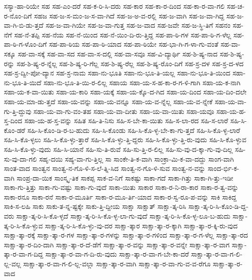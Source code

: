 {ಸಸ್ಯಾ-ಹಾ-ರಿಯೇ
ಸಹ
ಸಹ-ಎಂ-ದರೆ
ಸಹ-ಕ-ರಿ-ಸಿ-ದರು
ಸಹ-ಕಾರ
ಸಹ-ಕಾ-ರ-ದಿಂದ
ಸಹ-ಕಾ-ರ-ವಾ-ಗಲಿ
ಸಹ-ಚ-ರ-ನೊಂ-ದಿಗೆ
ಸಹಜ
ಸಹ-ಜ-ಸ-ಮಂ-ಜ-ಸ-ವಾ-ಗಿದೆ
ಸಹ-ಜ-ಅ-ವ-ರಲ್ಲಿ
ಸಹ-ಜ-ವಾಗಿ
ಸಹ-ಜ-ವಾ-ಗಿದ್ದ
ಸಹ-ಜ-ವಾ-ಗಿ-ಬಿ-ಡು-ತ್ತದೆ
ಸಹ-ಜ-ವಾ-ಗಿಯೇ
ಸಹ-ಜ-ವಾ-ಗುತ್ತ
ಸಹ-ಜ-ವಾದ
ಸಹ-ಜವೇ
ಸಹ-ಜ-ಸ್ಥಿ-ತಿಗೆ
ಸಹನಂ
ಸಹ-ನೆಗೆ
ಸಹ-ನೆ-ತಪ್ಪಿ
ಸಹ-ನೆಯ
ಸಹ-ನೆ-ಯಿಂದ
ಸಹ-ನೆ-ಯಿಂ-ದಿ-ರು-ತ್ತಿದ್ದ
ಸಹ-ಪಾ-ಠಿ-ಗಳ
ಸಹ-ಪಾ-ಠಿ-ಗ-ಳೆಲ್ಲ
ಸಹ-ಪಾ-ಠಿ-ಗ-ಳೊಂ-ದಿಗೆ
ಸಹ-ಪಾ-ಠಿಯ
ಸಹ-ಪಾ-ಠಿ-ಯಾದ
ಸಹ-ಪಾ-ಠಿಯೇ
ಸಹ-ಭಾ-ಗಿ-ಗ-ಳಾ-ಗು-ವಂತೆ
ಸಹ-ವಾ-ಸಕ್ಕೂ
ಸಹ-ವಾ-ಸಕ್ಕೆ
ಸಹ-ವಾ-ಸದ
ಸಹ-ವಾ-ಸ-ದಲ್ಲಿ
ಸಹ-ವಾ-ಸವೂ
ಸಹ-ವಿ-ದ್ಯಾರ್ಥಿ
ಸಹ-ಶಿ-ಷ್ಯ-ನಾದ
ಸಹ-ಶಿ-ಷ್ಯ-ರನ್ನು
ಸಹ-ಶಿ-ಷ್ಯ-ರ-ನ್ನೆಲ್ಲ
ಸಹ-ಶಿ-ಷ್ಯ-ರಿ-ಗೆಲ್ಲ
ಸಹ-ಶಿ-ಷ್ಯ-ರೆಲ್ಲ
ಸಹ-ಶಿ-ಷ್ಯ-ರೊಂ-ದಿಗೆ
ಸಹ-ಸ್ರ-ದಳ
ಸಹ-ಸ್ರ-ದ-ಳದ
ಸಹ-ಸ್ರ-ದ್ವೀ-ಪೋ-ದ್ಯಾನ
ಸಹ-ಸ್ರ-ನಾಮ
ಸಹಾ-ನು-ಭೂತಿ
ಸಹಾ-ನು-ಭೂ-ತಿ-ಯಲ್ಲ
ಸಹಾ-ನು-ಭೂ-ತಿ-ಯಿಂದ
ಸಹಾ-ನು-ಭೂ-ತಿ-ಯಿದೆ
ಸಹಾ-ನು-ಭೂ-ತಿ-ಯಿ-ರ-ಲಿಲ್ಲ
ಸಹಾಯ
ಸಹಾ-ಯ-ಸ-ಹ-ಕಾ-ರ-ಗ-ಳಿ-ಗಾಗಿ
ಸಹಾ-ಯ-ಕ-ನಾಗಿ
ಸಹಾ-ಯ-ಕ-ವಾ-ಯಿತು
ಸಹಾ-ಯ-ಕಾರಿ
ಸಹಾ-ಯಕ್ಕೆ
ಸಹಾ-ಯ-ಕ್ಕೊ-ದ-ಗಿದ
ಸಹಾ-ಯ-ದಿಂದ
ಸಹಾ-ಯ-ದಿಂ-ದಲೇ
ಸಹಾ-ಯ-ಮಾ-ಡು-ತ್ತದೆ
ಸಹಾ-ಯ-ವನ್ನು
ಸಹಾ-ಯ-ವನ್ನೂ
ಸಹಾ-ಯ-ವ-ನ್ನೆಲ್ಲ
ಸಹಾ-ಯ-ವ-ನ್ನೇಕೆ
ಸಹಾ-ಯ-ವಾ-ಗು-ತ್ತಿ-ದ್ದುವು
ಸಹಾ-ಯ-ವಾ-ಗು-ವಂ-ತಹ
ಸಹಾ-ಯ-ವಾ-ದೀತು
ಸಹಾ-ಯ-ವಾ-ಯಿತು
ಸಹಾ-ಯವೂ
ಸಹಾ-ಯ-ಹ-ಸ್ತ-ದಿಂದ
ಸಹಾ-ಯ-ಹ-ಸ್ತ-ವನ್ನು
ಸಹಿತ
ಸಹಿ-ತಿ-ನಿಸು
ಸಹಿ-ಸ-ಬೇ-ಕಾ-ಯಿತು
ಸಹಿ-ಸ-ಲಾ-ರದ
ಸಹಿ-ಸ-ಲಾರೆ
ಸಹಿ-ಸಿ-ಕೊಂ-ಡರೆ
ಸಹಿ-ಸಿ-ಕೊಂ-ಡಿ-ರ-ಬ-ಹುದು
ಸಹಿ-ಸಿ-ಕೊಂಡು
ಸಹಿ-ಸಿ-ಕೊ-ಳ್ಳ-ಬೇ-ಕಾ-ಗು-ತ್ತದೆ
ಸಹಿ-ಸಿ-ಕೊ-ಳ್ಳ-ಲಾರೆ
ಸಹಿ-ಸಿ-ಕೊ-ಳ್ಳಲು
ಸಹಿ-ಸಿ-ಕೊ-ಳ್ಳು-ತ್ತಾರೆ
ಸಹಿ-ಸಿ-ಕೊ-ಳ್ಳು-ತ್ತಿ-ದ್ದರು
ಸಹಿ-ಸಿ-ಕೊ-ಳ್ಳು-ತ್ತಿ-ರು-ವುದು
ಸಹಿ-ಸಿ-ಕೊ-ಳ್ಳುವ
ಸಹಿ-ಸಿ-ಕೊ-ಳ್ಳು-ವುದು
ಸಹಿ-ಸಿ-ಯಾನೆ
ಸಹಿ-ಸು-ತಿ-ರುವೆ
ಸಹಿ-ಸು-ತ್ತಿ-ರ-ಲಿಲ್ಲ
ಸಹಿ-ಸು-ವು-ದ-ಕ್ಕಾ-ಗು-ವು-ದಿಲ್ಲ
ಸಹಿ-ಸು-ವು-ದಾ-ಗಲಿ
ಸಹೃ-ದಯಿ
ಸಹ್ಯ-ವಾ-ಗು-ತ್ತಿಲ್ಲ
ಸಾ
ಸಾಂಕೇ-ತಿ-ಕ-ವಾಗಿ
ಸಾಂಕ್ರಾ-ಮಿ-ಕ-ವಾ-ದದ್ದು
ಸಾಂಗ-ವಾಗಿ
ಸಾಂತ-ವಾದ
ಸಾಂತ್ವನ
ಸಾಂತ್ವ-ನ-ಗೊ-ಳಿ-ಸ-ಲೆ-ತ್ನಿ-ಸಿದ
ಸಾಂತ್ವ-ನ-ಗೊ-ಳಿ-ಸುವ
ಸಾಂತ್ವ-ನ-ವನ್ನು
ಸಾಂದ-ರ್ಭಿ-ಕ-ವಾಗಿ
ಸಾಂಪ್ರ-ದಾ-ಯಿಕ
ಸಾಂಸ್ಕೃ-ತಿಕ
ಸಾಕಪ್ಪ
ಸಾಕ-ವ-ನಿಗೆ
ಸಾಕಷ್ಟು
ಸಾಕಾ-ಗದೆ
ಸಾಕಾ-ಗಿತ್ತು
ಸಾಕಾ-ಗಿ-ತ್ತು-ಇಡೀ
ಸಾಕಾ-ಗು-ತ್ತಿತ್ತು
ಸಾಕಾ-ಗು-ವಷ್ಟು
ಸಾಕಾ-ಗು-ವುದೆ
ಸಾಕಾ-ಯಿತು
ಸಾಕಾರ
ಸಾಕಾ-ರ-ನಿ-ರಾ-ಕಾರ
ಸಾಕಾ-ರ-ತ್ವ-ವನ್ನು
ಸಾಕಾ-ರನೂ
ಸಾಕಾ-ರನೆ
ಸಾಕಾ-ರ-ಮೂರ್ತಿ
ಸಾಕಾ-ರ-ಮೂ-ರ್ತಿ-ಯಾದ
ಸಾಕಾ-ರ-ಸ್ವ-ರೂ-ಪ-ವನ್ನು
ಸಾಕಿ
ಸಾಕಿದ್ದ
ಸಾಕಿ-ಸ-ಲಹಿ
ಸಾಕು
ಸಾಕು-ತ-ನ್ನ-ಷ್ಟಕ್ಕೇ
ಸಾಕು-ತ್ತಿ-ದ್ದೀಯ
ಸಾಕ್ಷಾ
ಸಾಕ್ಷಾತ್
ಸಾಕ್ಷಾ-ತ್ಕ-ರಿಸಿ
ಸಾಕ್ಷಾ-ತ್ಕ-ರಿ-ಸಿ-ಕೊಂ-ಡಿ-ದ್ದ-ವರು
ಸಾಕ್ಷಾ-ತ್ಕ-ರಿ-ಸಿ-ಕೊ-ಳ್ಳದೆ
ಸಾಕ್ಷಾ-ತ್ಕ-ರಿ-ಸಿ-ಕೊ-ಳ್ಳ-ಲಾ-ಗು-ವುದೆ
ಸಾಕ್ಷಾ-ತ್ಕ-ರಿ-ಸಿ-ಕೊ-ಳ್ಳ-ಲೂ-ಬ-ಹುದು
ಸಾಕ್ಷಾ-ತ್ಕ-ರಿ-ಸಿ-ಕೊ-ಳ್ಳುವ
ಸಾಕ್ಷಾ-ತ್ಕ-ರಿ-ಸಿ-ಕೊ-ಳ್ಳು-ವು-ದರ
ಸಾಕ್ಷಾ-ತ್ಕಾರ
ಸಾಕ್ಷಾ-ತ್ಕಾ-ರ-ಕ್ಕಾಗಿ
ಸಾಕ್ಷಾ-ತ್ಕಾ-ರ-ಕ್ಕಿ-ರು-ವುದ
ಸಾಕ್ಷಾ-ತ್ಕಾ-ರಕ್ಕೆ
ಸಾಕ್ಷಾ-ತ್ಕಾ-ರ-ಗಳ
ಸಾಕ್ಷಾ-ತ್ಕಾ-ರ-ಗಳನ್ನು
ಸಾಕ್ಷಾ-ತ್ಕಾ-ರ-ಗಳಿಂದ
ಸಾಕ್ಷಾ-ತ್ಕಾ-ರ-ಗ-ಳೆಲ್ಲ
ಸಾಕ್ಷಾ-ತ್ಕಾ-ರದ
ಸಾಕ್ಷಾ-ತ್ಕಾ-ರ-ದಿಂ-ದಾಗಿ
ಸಾಕ್ಷಾ-ತ್ಕಾ-ರ-ದೆ-ಡೆಗೆ
ಸಾಕ್ಷಾ-ತ್ಕಾ-ರ-ವನ್ನು
ಸಾಕ್ಷಾ-ತ್ಕಾ-ರ-ವನ್ನೇ
ಸಾಕ್ಷಾ-ತ್ಕಾ-ರ-ವಾಗ
ಸಾಕ್ಷಾ-ತ್ಕಾ-ರ-ವಾ-ಗ-ದಿದ್ದ
ಸಾಕ್ಷಾ-ತ್ಕಾ-ರ-ವಾ-ಗ-ದಿ-ರು-ವುದು
ಸಾಕ್ಷಾ-ತ್ಕಾ-ರ-ವಾ-ಗ-ಬೇ-ಕಾ-ದರೆ
ಸಾಕ್ಷಾ-ತ್ಕಾ-ರ-ವಾ-ಗ-ಲಿ-ಲ್ಲ-ವಲ್ಲ
ಸಾಕ್ಷಾ-ತ್ಕಾ-ರ-ವಾ-ಗ-ಲಿ-ಲ್ಲ-ವಲ್ಲಾ
ಸಾಕ್ಷಾ-ತ್ಕಾ-ರ-ವಾಗಿ
ಸಾಕ್ಷಾ-ತ್ಕಾ-ರ-ವಾ-ಗು-ವ-ವ-ರೆಗೂ
ಸಾಕ್ಷಾ-ತ್ಕಾ-ರ-ವಾದ
}
